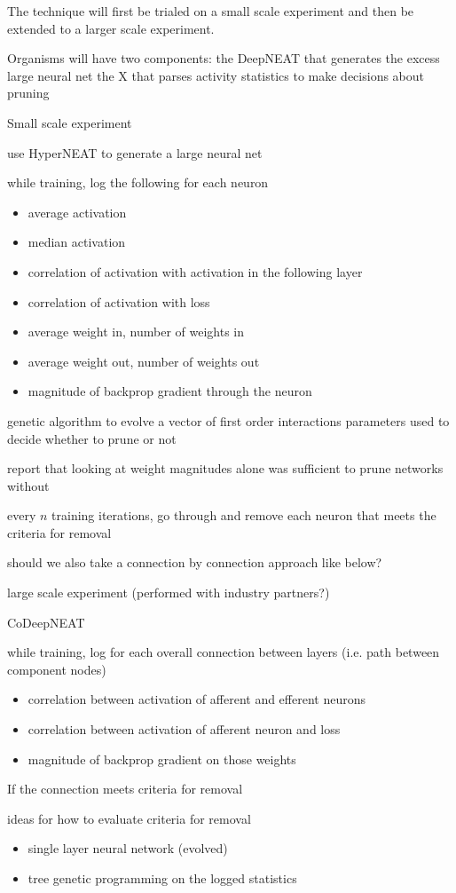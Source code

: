 The technique will first be trialed on a small scale experiment and then be extended to a larger scale experiment.

Organisms will have two components:
the DeepNEAT that generates the excess large neural net
the X that parses activity statistics to make decisions about pruning

Small scale experiment

use HyperNEAT to generate a large neural net

while training, log the following for each neuron
\begin{itemize}
\item average activation
\item median activation
\item correlation of activation with activation in the following layer
\item correlation of activation with loss
\item average weight in, number of weights in
\item average weight out, number of weights out
\item magnitude of backprop gradient through the neuron
\end{itemize}

genetic algorithm to evolve a vector of first order interactions parameters used to decide whether to prune or not


\autocite{song2015learning} report that looking at weight magnitudes alone was sufficient to prune networks without

every $n$ training iterations,
go through and remove each neuron that meets the criteria for removal

should we also take a connection by connection approach like below?

large scale experiment (performed with industry partners?)

CoDeepNEAT

while training, log for each overall connection between layers (i.e. path between component nodes)
\begin{itemize}
\item correlation between activation of afferent and efferent neurons
\item correlation between activation of afferent neuron and loss
\item magnitude of backprop gradient on those weights
\end{itemize}

If the connection meets criteria for removal

ideas for how to evaluate criteria for removal
\begin{itemize}
\item single layer neural network (evolved)
\item tree genetic programming on the logged statistics
\end{itemize}
